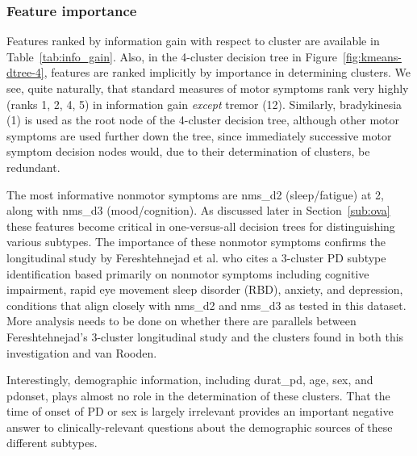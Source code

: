 \documentclass[10pt]{article}
\begin{document}
\subsubsection{Feature importance}
\label{feature-importance}

Features ranked by information gain with respect to cluster are available in
Table~\ref{tab:info_gain}. Also, in the 4-cluster decision tree in
Figure~\ref{fig:kmeans-dtree-4}, features are ranked implicitly by importance
in determining clusters. We see, quite naturally, that standard measures of
motor symptoms rank very highly (ranks 1, 2, 4, 5) in information gain \emph{except}
tremor (12). Similarly, bradykinesia (1) is used as the root node of the
4-cluster decision tree, although other motor symptoms are used further down
the tree, since immediately successive motor symptom decision nodes would, due
to their determination of clusters, be redundant.

The most informative nonmotor
symptoms are nms\_d2 (sleep/fatigue) at 2, along with nms\_d3
(mood/cognition). As discussed later in Section~\ref{sub:ova} these features
become critical in one-versus-all decision trees for distinguishing various
subtypes. The importance of these nonmotor symptoms confirms the longitudinal
study by Fereshtehnejad et al. \cite{fereshtehnejad15} who cites a 3-cluster PD
subtype identification based primarily on nonmotor symptoms including cognitive
impairment, rapid eye movement sleep disorder (RBD), anxiety, and depression,
conditions that align closely with nms\_d2 and nms\_d3 as tested in this
dataset. More analysis needs to be done on whether there are parallels between
Fereshtehnejad's 3-cluster longitudinal study and the clusters found in both
this investigation and van Rooden.

Interestingly, demographic information, including durat\_pd, age, sex, and
pdonset, plays almost no role in the determination of these clusters. That the
time of onset of PD or sex is largely irrelevant provides an important negative answer to
clinically-relevant questions about the demographic sources of these different
subtypes.
\end{document}
